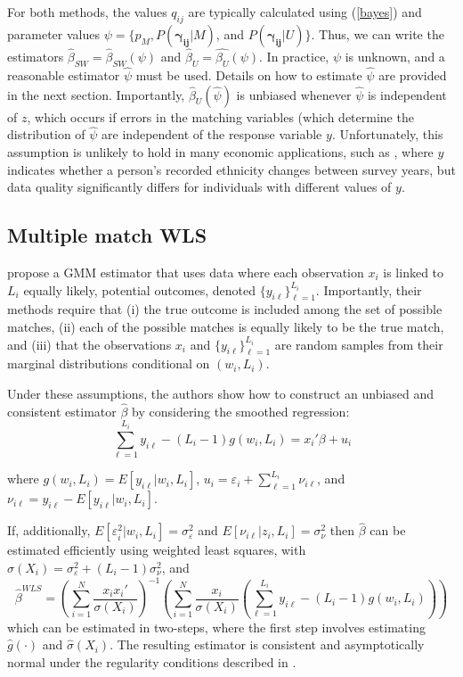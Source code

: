 \documentclass[12pt]{article}
\newcommand\gamij{\mathbf{\gamma_{ij}}}
\begin{document}
For both methods, the values $q_{ij}$ are typically calculated using (\ref{bayes}) and parameter values $\psi = \{p_M, P(\gamij | M)$, and $P(\gamij |U)\}$. Thus, we can write the estimators $\hat{\beta}_{SW} = \hat{\beta}_{SW}(\psi)$ and $\hat{\beta}_U = \hat{\beta_U}(\psi)$.  In practice, $\psi$ is unknown, and a reasonable estimator $\hat{\psi}$ must be used.   Details on how to estimate $\hat{\psi}$ are provided in the next section.   Importantly, $\hat{\beta}_U(\hat{\psi})$ is unbiased whenever $\hat{\psi}$ is independent of $z$, which occurs if errors in the matching variables (which determine the distribution of $\hat{\psi}$ are independent of the response variable $y$.  Unfortunately, this assumption is unlikely to hold in many economic applications, such as \cite{nq2015}, where $y$ indicates whether a person's recorded ethnicity changes between survey years, but data quality significantly differs for individuals with different values of $y$.  

\subsection{Multiple match WLS}

 \cite{ahl2019} propose a GMM estimator that uses data where each observation $x_i$ is linked to $L_i$ equally likely, potential outcomes, denoted $\{y_{i\ell}\}_{\ell=1}^{L_i}$.  Importantly, their methods require that (i) the true outcome is included among the set of possible matches, (ii) each of the possible matches is equally likely to be the true match, and (iii) that the observations $x_i$ and $\{y_{i\ell}\}_{\ell=1}^{L_i}$ are random samples from their marginal distributions conditional on $(w_i, L_i)$.  
 
Under these assumptions, the authors show how to construct an unbiased and consistent estimator $\hat{\beta}$ by considering the smoothed regression:
\begin{equation} 
\sum_{\ell=1}^{L_i} y_{i\ell} - (L_i - 1)g(w_i, L_i) = x_i'\beta + u_i  \end{equation}

\noindent where $g(w_i, L_i) = E[y_{i\ell} | w_i, L_i ]$, $u_i = \varepsilon_i + \sum_{\ell=1}^{L_i}\nu_{i\ell}$, and $\nu_{i\ell} = y_{i\ell} - E[y_{i\ell} | w_i, L_i ]$. 

If, additionally, $E[\varepsilon_i^2 | w_i, L_i] = \sigma_{\varepsilon}^2$ and $E[\nu_{i\ell} | z_i, L_i] = \sigma_{\nu}^2$ then $\hat{\beta}$ can be estimated efficiently using weighted least squares, with $\sigma(X_i) = \sigma_{\varepsilon}^2 + (L_i - 1)\sigma_{\nu}^2$, and
\begin{equation}
\hat{\beta}^{WLS} = \left(\sum_{i=1}^N \frac{x_ix_i'}{\sigma(X_i)}\right)^{-1}\left(\sum_{i=1}^N \frac{x_i}{\sigma(X_i)}\left(\sum_{\ell=1}^{L_i} y_{i\ell} - (L_i - 1) g(w_i, L_i)\right)\right)
\end{equation}
which can be estimated in two-steps, where the first step involves estimating $\hat{g}(\cdot)$ and $\hat{\sigma}(X_i)$.  The resulting estimator is consistent and asymptotically normal under the regularity conditions described in \cite{ahl2019}. 
\end{document}
